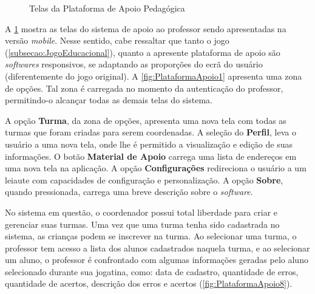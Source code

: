 \documentclass[alpha-refs,brazilian]{RBCA_v2.0}
\begin{document}
\begin{figure}[h]
  \caption{Telas da Plataforma de Apoio Pedagógica}
  \label{fig:PlataformaApoio}
\end{figure} 


A \cref{fig:PlataformaApoio} mostra as telas do sistema de apoio ao professor sendo apresentadas na versão \textit{mobile}. Nesse sentido, cabe ressaltar que tanto o jogo (\cref{subsecao:JogoEducacional}), quanto a apresente plataforma de apoio são \textit{softwares} responsivos, se adaptando as proporções do ecrã do usuário (diferentemente do jogo original). A \cref{fig:PlataformaApoio1} apresenta uma zona de opções. Tal zona é carregada no momento da autenticação do professor, permitindo-o alcançar todas as demais telas do sistema. 

A opção \textbf{Turma}, da zona de opções, apresenta uma nova tela com todas as turmas que foram criadas para serem coordenadas. A seleção do \textbf{Perfil}, leva o usuário a uma nova tela, onde lhe é permitido a visualização e edição de suas informações. O botão \textbf{Material de Apoio} carrega uma lista de endereços em uma nova tela na aplicação. A opção \textbf{Configurações} redireciona o usuário a um leiaute com capacidades de configuração e personalização. A opção \textbf{Sobre}, quando pressionada, carrega uma breve descrição sobre o \textit{software}.

No sistema em questão, o coordenador possui total liberdade para criar e gerenciar suas turmas. Uma vez que uma turma tenha sido cadastrada no sistema, as crianças podem se inscrever na turma. Ao selecionar uma turma, o professor tem acesso a lista dos alunos cadastrados naquela turma, e ao selecionar um aluno, o professor é confrontado com algumas informações geradas pelo aluno selecionado durante sua jogatina, como: data de cadastro, quantidade de erros, quantidade de acertos, descrição dos erros e acertos (\cref{fig:PlataformaApoio8}).
\end{document}
